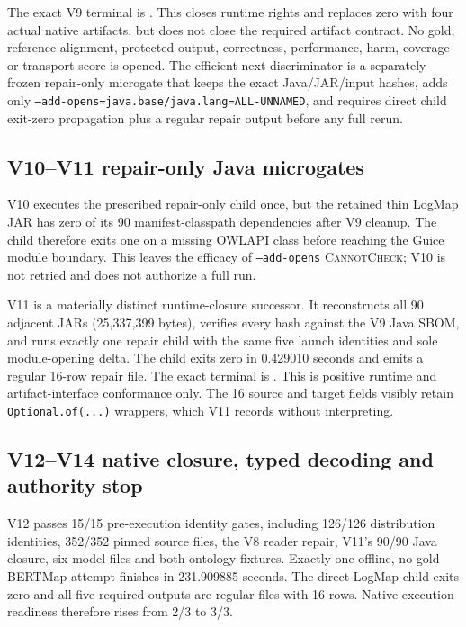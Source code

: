 The exact V9 terminal is
.
This closes runtime rights and replaces zero with four actual native artifacts,
but does not close the required artifact contract. No gold, reference alignment,
protected output, correctness, performance, harm, coverage or transport score is
opened. The efficient next discriminator is a separately frozen repair-only
microgate that keeps the exact Java/JAR/input hashes, adds only
\texttt{--add-opens=java.base/java.lang=ALL-UNNAMED}, and requires direct child
exit-zero propagation plus a regular repair output before any full rerun.

\subsection{V10--V11 repair-only Java microgates}

V10 executes the prescribed repair-only child once, but the retained thin
LogMap JAR has zero of its 90 manifest-classpath dependencies after V9 cleanup.
The child therefore exits one on a missing OWLAPI class before reaching the
Guice module boundary. This leaves the efficacy of \texttt{--add-opens}
\textsc{CannotCheck}; V10 is not retried and does not authorize a full run.

V11 is a materially distinct runtime-closure successor. It reconstructs all
90 adjacent JARs (25,337,399 bytes), verifies every hash against the V9 Java
SBOM, and runs exactly one repair child with the same five launch identities
and sole module-opening delta. The child exits zero in 0.429010 seconds and
emits a regular 16-row repair file. The exact terminal is
.
This is positive runtime and artifact-interface conformance only. The 16 source
and target fields visibly retain \texttt{Optional.of(...)} wrappers, which V11
records without interpreting.

\subsection{V12--V14 native closure, typed decoding and authority stop}

V12 passes 15/15 pre-execution identity gates, including 126/126 distribution
identities, 352/352 pinned source files, the V8 reader repair, V11's 90/90 Java
closure, six model files and both ontology fixtures. Exactly one offline,
no-gold BERTMap attempt finishes in 231.909885 seconds. The direct LogMap child
exits zero and all five required outputs are regular files with 16 rows. Native
execution readiness therefore rises from 2/3 to 3/3.

